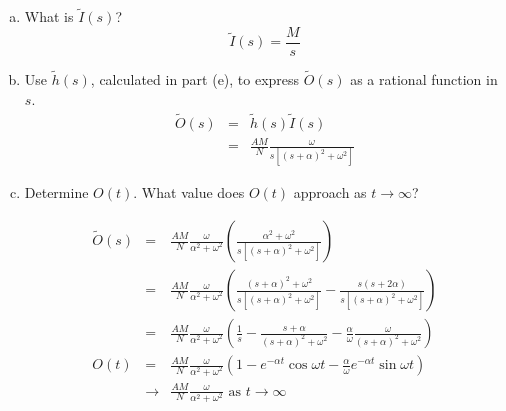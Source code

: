 \documentclass{article}
\begin{document}
\begin{enumerate}[a)]  
\setlength{\itemsep}{0pt}
\setcounter{enumi}{4}
\item What is $\tilde{I}(s)$?\\

{\color{red}
\[ \tilde{I}(s) = \frac{M}{s} \]
}

\item Use $\tilde{h}(s)$, calculated in part (e), to express $\tilde{O}(s)$ as a rational function in $s$.\\

{\color{red}
\begin{eqnarray*}
 \tilde{O}(s) & = & \tilde{h}(s)  \tilde{I}(s)\\
 & = & \frac{A M}{N} \frac{\omega}{s \left[ \left(s + \alpha \right)^2 + \omega^2 \right]}
 \end{eqnarray*}
}

\item Determine $O(t)$. What value does $O(t)$ approach as $t \to \infty$?

{\color{red}
\begin{eqnarray*}
 \tilde{O}(s) & = & \frac{A M}{N} \frac{\omega}{\alpha^2 + \omega^2} \left( \frac{\alpha^2 + \omega^2}{s \left[ \left(s + \alpha \right)^2 + \omega^2 \right]} \right)\\
 & = & \frac{A M}{N} \frac{\omega}{\alpha^2 + \omega^2} \left(   \frac{\left( s + \alpha \right)^2 + \omega^2}{s \left[ \left(s + \alpha \right)^2 + \omega^2 \right]}  - \frac{s \left( s + 2 \alpha \right)}{s \left[ \left(s + \alpha \right)^2 + \omega^2 \right]} \right)\\
  & = & \frac{A M}{N} \frac{\omega}{\alpha^2 + \omega^2} \left(   \frac{1}{s}  - \frac{s + \alpha}{\left(s + \alpha \right)^2 + \omega^2} - \frac{\alpha}{\omega} \frac{\omega}{\left(s + \alpha \right)^2 + \omega^2} \right)\\
  O(t) & = & \frac{A M}{N} \frac{\omega}{\alpha^2 + \omega^2} \left( 1 - e^{-\alpha t} \cos \omega t - \frac{\alpha}{\omega} e^{-\alpha t} \sin \omega t \right)\\
 & \to & \frac{A M}{N} \frac{\omega}{\alpha^2 + \omega^2} \textrm{ as } t \to \infty
 \end{eqnarray*}
}

\end{enumerate}
\end{document}
